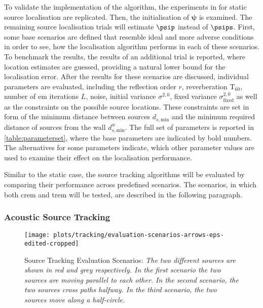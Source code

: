 To validate the implementation of the algorithm, the experiments in \cite{Schwartz2014} for static source localisation are replicated. Then, the initialisation of $\bm\psi$ is examined. The remaining source localisation trials will estimate $\psip$ instead of $\psips$. First, some base scenarios are defined that resemble ideal and more adverse conditions in order to see, how the localisation algorithm performs in each of these scenarios. To benchmark the results, the results of an additional trial is reported, where location estimates are guessed, providing a natural lower bound for the localisation error. After the results for these scenarios are discussed, individual parameters are evaluated, including the reflection order $r$, reverberation T$_{60}$, number of \gls{em} iterations $L$, noise, initial variance $\sigma^{2,\text{0}}$, fixed variance $\sigma^{2,\text{0}}_{\text{fixed}}$ as well as the constraints on the possible source locations. These constraints are set in form of the minimum distance between sources $d_{s,\text{min}}$ and the minimum required distance of sources from the wall $d^w_{s,\text{min}}$. The full set of parameters is reported in \autoref{table:parameterset}, where the base parameters are indicated by bold numbers. The alternatives for some parameters indicate, which other parameter values are used to examine their effect on the localisation performance.


Similar to the static case, the source tracking algorithms will be evaluated by comparing their performance across predefined scenarios. The scenarios, in which both \gls{crem} and \gls{trem} will be tested, are described in the following paragraph.



\subsubsection*{Acoustic Source Tracking}
\label{sec:evalScenariosTracking}

\begin{figure}[H]
    \setlength\figureheight{4cm}
    \setlength\figurewidth{\textwidth}
    \texttt{[image: plots/tracking/evaluation-scenarios-arrows-eps-edited-cropped]}
    
    \caption[Source Tracking Evaluation Scenarios]{Source Tracking Evaluation Scenarios: \itshape The two different sources are shown in red and grey respectively. In the first scenario the two sources are moving parallel to each other. In the second scenario, the two sources cross paths halfway. In the third scenario, the two sources move along a half-circle.}
    \label{fig:evalScenariosTracking}
\end{figure}

